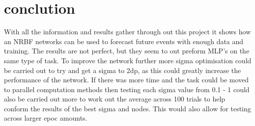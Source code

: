 \documentclass{IEEEtran}[11pt]
\begin{document}
\section{conclution}
\begin{flushleft}
  With all the information and results gather through out this project it shows
  how an NRBF networks can be used to forecast future events with enough data and
  training. The results are not perfect, but they seem to out preform MLP's on the
  same type of task. To improve the network further more sigma optimisation
  could be carried out to try and get a sigma to 2dp, as this could greatly increase
  the performance of the network. If there was more time and the task could be
  moved to parallel computation methods then testing each sigma value from 0.1
  - 1 could also be carried out more to work out the average across 100 trials to
  help conform the results of the best sigma and nodes. This would also allow
  for testing across larger epoc amounts.
  \\
  \vspace{1.5mm}
\end{flushleft}
\end{document}

